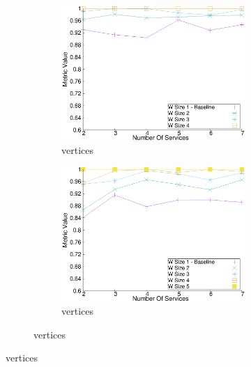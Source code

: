 \begin{figure}[H]
\begin{adjustbox}{minipage=\linewidth,scale=0.75}
\begin{subfigure}{0.45\textwidth}
    \begin{subfigure}{\textwidth}
      \includegraphics[width=\textwidth]{Images/graphs/window_quality_performance_diff_perce_n7_s7_50_89_n4}
      \caption{ vertices}

      \label{fig:quality_window_average_perce_n4}
    \end{subfigure}
    \begin{subfigure}{\textwidth}
      \includegraphics[width=\textwidth]{Images/graphs/window_quality_performance_diff_perce_n7_s7_50_89_n5}
      \caption{ vertices}
      \label{fig:quality_window_average_perce_n5}
    \end{subfigure}


\end{subfigure}
\end{adjustbox}
\end{figure}

